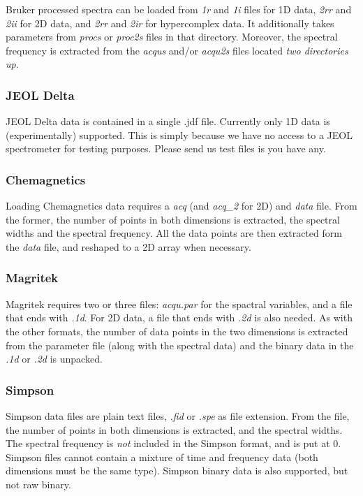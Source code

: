 \documentclass[11pt,a4paper]{article}
\begin{document}
Bruker processed spectra can be loaded from \textit{1r} and \textit{1i} files for 1D data, \textit{2rr} and \textit{2ii} for 2D data, and \textit{2rr} and \textit{2ir} for hypercomplex data. It additionally takes parameters from \textit{procs} or \textit{proc2s} files in that directory. Moreover, the spectral frequency is extracted from the \textit{acqus} and/or \textit{acqu2s} files located \textit{two directories up}.

 
\subsubsection*{JEOL Delta}
JEOL Delta data is contained in a single .jdf file. Currently only 1D data is (experimentally) supported. This is simply because we have no access to a JEOL spectrometer for testing purposes. Please send us test files is you have any.

\subsubsection*{Chemagnetics}
Loading Chemagnetics data requires a \textit{acq} (and \textit{acq\_2} for 2D) and \textit{data} file. From the former, the number of points in both dimensions is extracted, the spectral widths and the spectral frequency. All the data points are then extracted form the \textit{data} file, and reshaped to a 2D array when necessary.

\subsubsection*{Magritek}
Magritek requires two or three files: \textit{acqu.par} for the spactral variables, and a file that ends with \textit{.1d}. For 2D data, a file that ends with \textit{.2d} is also needed. As with the other formats, the number of data points in the two dimensions is extracted from the parameter file (along with the spectral data) and the binary data in the \textit{.1d} or \textit{.2d} is unpacked.

\subsubsection*{Simpson}
Simpson data files are plain text files, \textit{.fid} or \textit{.spe} as file extension. From the file, the number of points in both dimensions is extracted, and the spectral widths. The spectral frequency is \textit{not} included in the Simpson format, and is put at 0. Simpson files cannot contain a mixture of time and frequency data (both dimensions must be the same type). Simpson binary data is also supported, but not raw binary.
\end{document}
